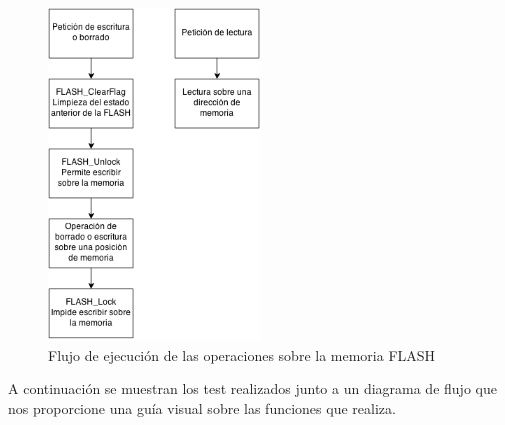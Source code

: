 \begin{figure}[!h]
\begin{center}
\includegraphics[width=0.5\textwidth]{figs/FLASHDiagram.png}
\caption{Flujo de ejecución de las operaciones sobre la memoria FLASH}
\label{fig:FLASHDiagram}
\end{center}
\end{figure}

A continuación se muestran los test realizados junto a un diagrama de flujo que nos proporcione una guía visual sobre las funciones que realiza. \\


